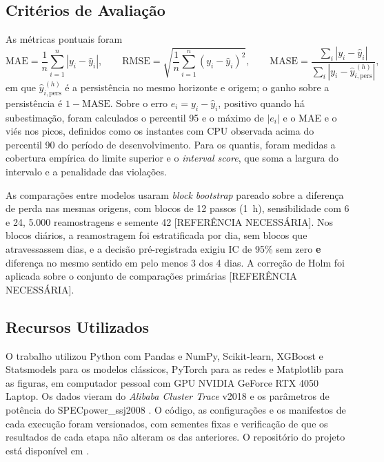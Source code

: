 \documentclass[a4paper,12pt]{article}
\newcommand{\refnec}{[REFERÊNCIA NECESSÁRIA]}
\begin{document}
\subsection{Critérios de Avaliação}
\label{sec:criterios}

As métricas pontuais foram
\begin{equation}
\mathrm{MAE} = \frac{1}{n}\sum_{i=1}^{n} |y_i - \hat{y}_i|, \qquad
\mathrm{RMSE} = \sqrt{\frac{1}{n}\sum_{i=1}^{n} (y_i - \hat{y}_i)^2}, \qquad
\mathrm{MASE} = \frac{\sum_{i} |y_i - \hat{y}_i|}{\sum_{i} |y_i - \hat{y}^{\,(h)}_{i,\mathrm{pers}}|},
\end{equation}
em que $\hat{y}^{\,(h)}_{i,\mathrm{pers}}$ é a persistência no mesmo horizonte e origem; o ganho sobre a persistência é $1 - \mathrm{MASE}$. Sobre o erro $e_i = y_i - \hat{y}_i$, positivo quando há subestimação, foram calculados o percentil 95 e o máximo de $|e_i|$ e o MAE e o viés nos picos, definidos como os instantes com CPU observada acima do percentil 90 do período de desenvolvimento. Para os quantis, foram medidas a cobertura empírica do limite superior e o \textit{interval score}, que soma a largura do intervalo e a penalidade das violações.

As comparações entre modelos usaram \textit{block bootstrap} pareado sobre a diferença de perda nas mesmas origens, com blocos de 12 passos (1~h), sensibilidade com 6 e 24, 5.000 reamostragens e semente 42 \refnec. Nos blocos diários, a reamostragem foi estratificada por dia, sem blocos que atravessassem dias, e a decisão pré-registrada exigiu IC de 95\% sem zero \textbf{e} diferença no mesmo sentido em pelo menos 3 dos 4 dias. A correção de Holm foi aplicada sobre o conjunto de comparações primárias \refnec.

\subsection{Recursos Utilizados}

O trabalho utilizou Python com Pandas e NumPy, Scikit-learn, XGBoost e Statsmodels para os modelos clássicos, PyTorch para as redes e Matplotlib para as figuras, em computador pessoal com GPU NVIDIA GeForce RTX 4050 Laptop. Os dados vieram do \textit{Alibaba Cluster Trace} v2018 \cite{alibaba2018clusterdata} e os parâmetros de potência do SPECpower\_ssj2008 \cite{spec2008power}. O código, as configurações e os manifestos de cada execução foram versionados, com sementes fixas e verificação de que os resultados de cada etapa não alteram os das anteriores. O repositório do projeto está disponível em \cite{repotcc}.
\end{document}
